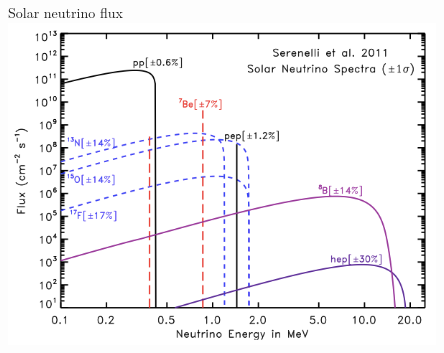 \begin{frame}[t]{Solar neutrino flux}
\centering
\includegraphics[width=0.85\textwidth]{./images/3nu/solar/solar_nu_flux_2.png}\\
\end{frame}

